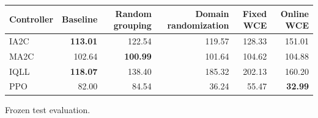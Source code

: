 \begin{tabular}{lrrrrr}
\hline
Controller & Baseline & Random grouping & Domain randomization & Fixed WCE & Online WCE \\
\hline
IA2C & \textbf{113.01} & 122.54 & 119.57 & 128.33 & 151.01 \\
MA2C & 102.64 & \textbf{100.99} & 101.64 & 104.62 & 104.88 \\
IQLL & \textbf{118.07} & 138.40 & 185.32 & 202.13 & 160.20 \\
PPO & 82.00 & 84.54 & 36.24 & 55.47 & \textbf{32.99} \\
\hline
\end{tabular}
Frozen test evaluation.
